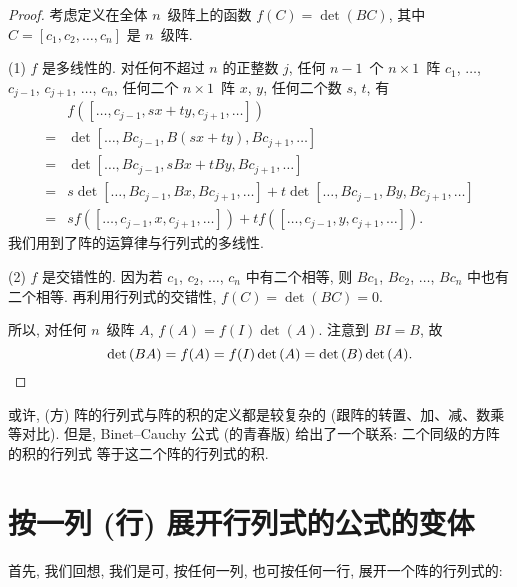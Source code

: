 \begin{proof}
    考虑定义在全体 \(n\)~级阵上的函数
    \(f(C) = \det {(BC)}\),
    其中 \(C = [c_1, c_2, \dots, c_n]\) 是 \(n\)~级阵.

    (1)
    \(f\) 是多线性的.
    对任何不超过 \(n\) 的正整数 \(j\),
    任何 \(n-1\)~个 \(n \times 1\)~阵
    \(c_1\), \(\dots\), \(c_{j-1}\),
    \(c_{j+1}\), \(\dots\), \(c_n\),
    任何二个 \(n \times 1\)~阵 \(x\), \(y\),
    任何二个数 \(s\), \(t\),
    有
    \begin{align*}
             &
        f([\dots, c_{j-1}, sx + ty, c_{j+1}, \dots])
        \\
        = {} &
        \det {[\dots, Bc_{j-1}, B(sx + ty), Bc_{j+1}, \dots]}
        \\
        = {} &
        \det {[\dots, Bc_{j-1}, sBx + tBy, Bc_{j+1}, \dots]}
        \\
        = {} &
        s\det {[\dots, Bc_{j-1}, Bx, Bc_{j+1}, \dots]}
        +
        t\det {[\dots, Bc_{j-1}, By, Bc_{j+1}, \dots]}
        \\
        = {} &
        s f([\dots, c_{j-1}, x, c_{j+1}, \dots])
        +
        t f([\dots, c_{j-1}, y, c_{j+1}, \dots]).
    \end{align*}
    我们用到了阵的运算律与行列式的多线性.

    (2)
    \(f\) 是交错性的.
    因为若 \(c_1\), \(c_2\), \(\dots\), \(c_n\) 中有二个相等,
    则 \(Bc_1\), \(Bc_2\), \(\dots\), \(Bc_n\) 中也有二个相等.
    再利用行列式的交错性,
    \(f(C) = \det {(BC)} = 0\).

    所以, 对任何 \(n\)~级阵 \(A\),
    \(f(A) = f(I) \det {(A)}\).
    注意到 \(BI = B\),
    故
    \begin{equation*}
        \det {(BA)} = f(A) = f(I) \det {(A)}
        = \det {(B)} \det {(A)}.
        \qedhere
    \end{equation*}
\end{proof}

或许, (方) 阵的行列式与阵的积的定义都是较复杂的
(跟阵的转置、加、减、数乘等对比).
但是, Binet--Cauchy 公式 (的青春版) 给出了一个联系:
二个同级的方阵的积的行列式%
等于这二个阵的行列式的积.

\section{按一列 (行) 展开行列式的公式的变体}

首先, 我们回想,
我们是可,
按任何一列, 也可按任何一行,
展开一个阵的行列式的:


